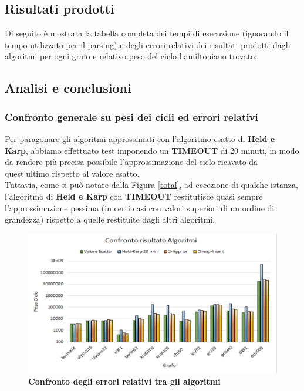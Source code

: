 \documentclass[]{article}
\begin{document}
\subsection{Risultati prodotti}
\begin{flushleft}
Di seguito è mostrata la tabella completa dei tempi di esecuzione (ignorando il tempo utilizzato per il parsing) e degli errori relativi dei risultati prodotti dagli algoritmi per ogni grafo e relativo peso del ciclo hamiltoniano trovato: 



\subsection{Analisi e conclusioni}
\subsubsection{Confronto generale su pesi dei cicli ed errori relativi}
Per paragonare gli algoritmi approssimati con l'algoritmo esatto di \textbf{Held e Karp}, abbiamo effettuato test imponendo un \textbf{TIMEOUT} di 20 minuti, in modo da rendere più precisa possibile l'approssimazione del ciclo ricavato da quest'ultimo rispetto al valore esatto.\\
Tuttavia, come si può notare dalla Figura \ref{total}, ad eccezione di qualche istanza, l'algoritmo di \textbf{Held e Karp} con \textbf{TIMEOUT} restitutisce quasi sempre l'approssimazione pessima (in certi casi con valori superiori di un ordine di grandezza) rispetto a quelle restituite dagli altri algoritmi.
\begin{figure}[H]
	\centering
	\includegraphics[width=\textwidth,height=\textheight,keepaspectratio]{CONFRONTO_RISULTATI.png}
	\caption{\textbf{Confronto degli errori relativi tra gli algoritmi}}

\end{figure}
\end{flushleft}
\end{document}
